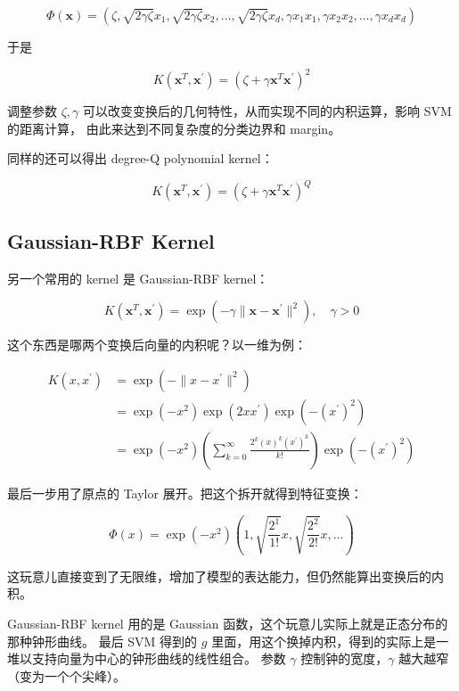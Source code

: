 \documentclass[a4paper]{article}
\begin{document}
$$\Phi(\mathbf{x}) = \left ( \zeta, \sqrt{2\gamma\zeta}x_1, \sqrt{2\gamma\zeta}x_2, \dots, \sqrt{2\gamma\zeta}x_d, \gamma x_1x_1, \gamma x_2x_2, \dots, \gamma x_dx_d \right )$$

于是

$$K(\mathbf{x}^T, \mathbf{x}^{\prime}) = (\zeta + \gamma\mathbf{x}^T\mathbf{x}^{\prime})^2$$

调整参数 $\zeta, \gamma$ 可以改变变换后的几何特性，从而实现不同的内积运算，影响 SVM 的距离计算，
由此来达到不同复杂度的分类边界和 margin。

同样的还可以得出 degree-Q polynomial kernel：

$$K(\mathbf{x}^T, \mathbf{x}^{\prime}) = (\zeta + \gamma\mathbf{x}^T\mathbf{x}^{\prime})^Q$$


\subsection{Gaussian-RBF Kernel}
另一个常用的 kernel 是 Gaussian-RBF kernel：

$$K(\mathbf{x}^T, \mathbf{x}^{\prime}) = \exp \left ( -\gamma \| \mathbf{x} - \mathbf{x}^{\prime} \|^2 \right ), \quad \gamma > 0$$

这个东西是哪两个变换后向量的内积呢？以一维为例：

\begin{equation}
\begin{aligned}
K(x, x^{\prime}) &= \exp \left ( -\| x - x^{\prime} \|^2  \right ) \\
                 &= \exp \left ( -x^2 \right ) \exp \left ( 2xx^{\prime} \right ) \exp \left ( -(x^{\prime})^2 \right ) \\
                 &= \exp \left ( -x^2 \right ) \left ( \sum_{k=0}^{\infty}\frac{2^k(x)^k(x^{\prime})^k}{k!} \right ) \exp \left ( -(x^{\prime})^2 \right )
\end{aligned}
\end{equation}

最后一步用了原点的 Taylor 展开。把这个拆开就得到特征变换：

$$ \Phi(x) = \exp(-x^2) \left ( 1, \sqrt{\frac{2^1}{1!}}x, \sqrt{\frac{2^2}{2!}}x, \dots \right )$$

这玩意儿直接变到了无限维，增加了模型的表达能力，但仍然能算出变换后的内积。

Gaussian-RBF kernel 用的是 Gaussian 函数，这个玩意儿实际上就是正态分布的那种钟形曲线。
最后 SVM 得到的 $g$ 里面，用这个换掉内积，得到的实际上是一堆以支持向量为中心的钟形曲线的线性组合。
参数 $\gamma$ 控制钟的宽度，$\gamma$ 越大越窄（变为一个个尖峰）。
\end{document}
